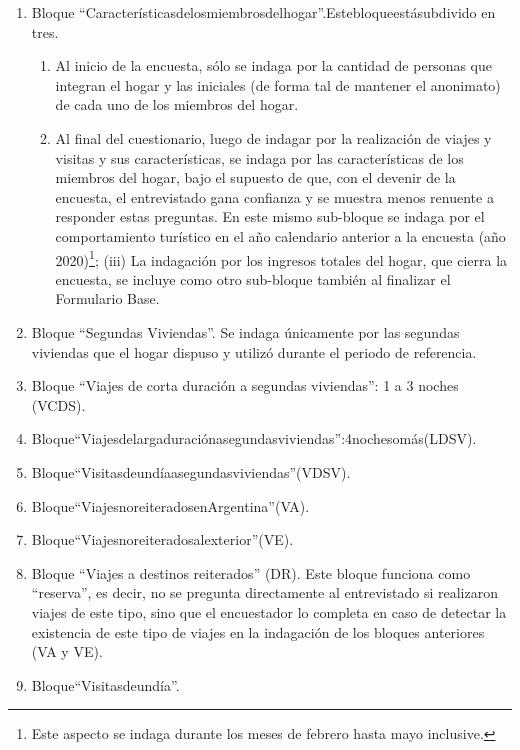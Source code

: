 \documentclass[
  openany]{book}
\providecommand{\tightlist}{%
  \setlength{\itemsep}{0pt}\setlength{\parskip}{0pt}}
\begin{document}
\begin{enumerate}
\def\labelenumi{\arabic{enumi}.}
\item
  Bloque ``Característicasdelosmiembrosdelhogar''.Estebloqueestásubdivido en tres.

  \begin{enumerate}
  \def\labelenumii{(\roman{enumii})}
  \tightlist
  \item
    Al inicio de la encuesta, sólo se indaga por la cantidad de personas que integran el hogar y las iniciales (de forma tal de mantener el anonimato) de cada uno de los miembros del hogar.
  \item
    Al final del cuestionario, luego de indagar por la realización de viajes y visitas y sus características, se indaga por las características de los miembros del hogar, bajo el supuesto de que, con el devenir de la encuesta, el entrevistado gana confianza y se muestra menos renuente a responder estas preguntas. En este mismo sub-bloque se indaga por el comportamiento turístico en el año calendario anterior a la encuesta (año 2020)\footnote{Este aspecto se indaga durante los meses de febrero hasta mayo inclusive.}; (iii) La indagación por los ingresos totales del hogar, que cierra la encuesta, se incluye como otro sub-bloque también al finalizar el Formulario Base.
  \end{enumerate}
\item
  Bloque ``Segundas Viviendas''.
  Se indaga únicamente por las segundas viviendas que el hogar dispuso y utilizó durante el periodo de referencia.
\item
  Bloque ``Viajes de corta duración a segundas viviendas'': 1 a 3 noches (VCDS).
\item
  Bloque``Viajesdelargaduraciónasegundasviviendas'':4nochesomás(LDSV).
\item
  Bloque``Visitasdeundíaasegundasviviendas''(VDSV).
\item
  Bloque``ViajesnoreiteradosenArgentina''(VA).
\item
  Bloque``Viajesnoreiteradosalexterior''(VE).
\item
  Bloque ``Viajes a destinos reiterados'' (DR).
  Este bloque funciona como ``reserva'', es decir, no se pregunta directamente al entrevistado si realizaron viajes de este tipo, sino que el encuestador lo completa en caso de detectar la existencia de este tipo de viajes en la indagación de los bloques anteriores (VA y VE).
\item
  Bloque``Visitasdeundía''.
\end{enumerate}
\end{document}
